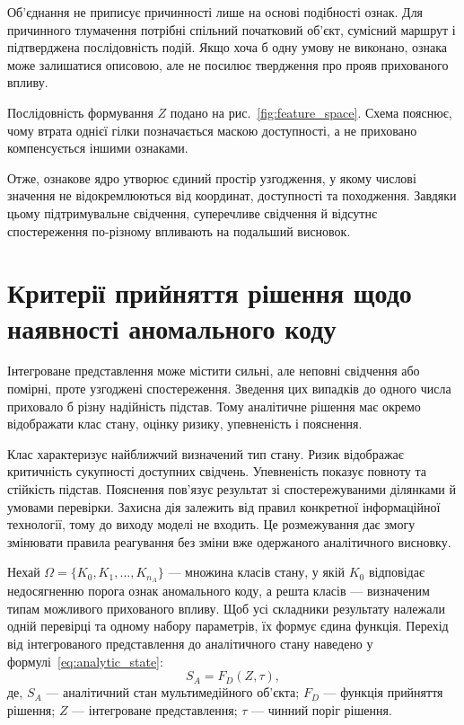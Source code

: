 Об’єднання не приписує причинності лише на основі подібності ознак. Для причинного тлумачення потрібні спільний початковий об’єкт, сумісний маршрут і підтверджена послідовність подій. Якщо хоча б одну умову не виконано, ознака може залишатися описовою, але не посилює твердження про прояв прихованого впливу.

Послідовність формування $Z$ подано на рис.~\ref{fig:feature_space}. Схема пояснює, чому втрата однієї гілки позначається маскою доступності, а не приховано компенсується іншими ознаками.



Отже, ознакове ядро утворює єдиний простір узгодження, у якому числові значення не відокремлюються від координат, доступності та походження. Завдяки цьому підтримувальне свідчення, суперечливе свідчення й відсутнє спостереження по-різному впливають на подальший висновок.

\section{Критерії прийняття рішення щодо наявності аномального коду}
\label{sec:decision_criteria}

Інтегроване представлення може містити сильні, але неповні свідчення або помірні, проте узгоджені спостереження. Зведення цих випадків до одного числа приховало б різну надійність підстав. Тому аналітичне рішення має окремо відображати клас стану, оцінку ризику, упевненість і пояснення.

Клас характеризує найближчий визначений тип стану. Ризик відображає критичність сукупності доступних свідчень. Упевненість показує повноту та стійкість підстав. Пояснення пов’язує результат зі спостережуваними ділянками й умовами перевірки. Захисна дія залежить від правил конкретної інформаційної технології, тому до виходу моделі не входить. Це розмежування дає змогу змінювати правила реагування без зміни вже одержаного аналітичного висновку.

Нехай $\Omega=\{K_0,K_1,\ldots,K_{n_A}\}$ --- множина класів стану, у якій $K_0$ відповідає недосягненню порога ознак аномального коду, а решта класів --- визначеним типам можливого прихованого впливу. Щоб усі складники результату належали одній перевірці та одному набору параметрів, їх формує єдина функція. Перехід від інтегрованого представлення до аналітичного стану наведено у формулі~\eqref{eq:analytic_state}:
\begin{equation}
S_A=F_D(Z,\tau),
\label{eq:analytic_state}
\end{equation}
де, $S_A$ --- аналітичний стан мультимедійного об’єкта; $F_D$ --- функція прийняття рішення; $Z$ --- інтегроване представлення; $\tau$ --- чинний поріг рішення.


